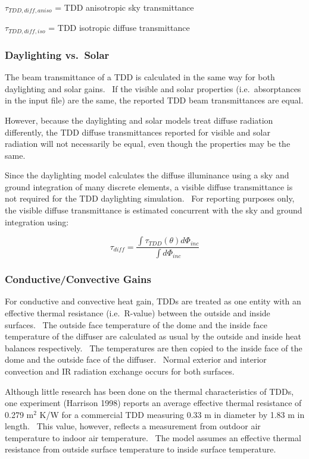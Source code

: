 \(\tau_{TDD,diff,aniso}\) = TDD anisotropic sky transmittance

\(\tau_{TDD,diff,iso}\) = TDD isotropic diffuse transmittance

\subsubsection{Daylighting vs.~Solar}\label{daylighting-vs.solar}

The beam transmittance of a TDD is calculated in the same way for both daylighting and solar gains.~ If the visible and solar properties (i.e.~absorptances in the input file) are the same, the reported TDD beam transmittances are equal.

However, because the daylighting and solar models treat diffuse radiation differently, the TDD diffuse transmittances reported for visible and solar radiation will not necessarily be equal, even though the properties may be the same.

Since the daylighting model calculates the diffuse illuminance using a sky and ground integration of many discrete elements, a visible diffuse transmittance is not required for the TDD daylighting simulation.~ For reporting purposes only, the visible diffuse transmittance is estimated concurrent with the sky and ground integration using:

\begin{equation}
{\tau_{diff}} = \frac{{\int {{\tau_{TDD}}(\theta )d{\Phi_{inc}}} }}{{\int {d{\Phi_{inc}}} }}
\end{equation}

\subsubsection{Conductive/Convective Gains}\label{conductiveconvective-gains}

For conductive and convective heat gain, TDDs are treated as one entity with an effective thermal resistance (i.e.~R-value) between the outside and inside surfaces.~ The outside face temperature of the dome and the inside face temperature of the diffuser are calculated as usual by the outside and inside heat balances respectively.~ The temperatures are then copied to the inside face of the dome and the outside face of the diffuser.~ Normal exterior and interior convection and IR radiation exchange occurs for both surfaces.

Although little research has been done on the thermal characteristics of TDDs, one experiment (Harrison 1998) reports an average effective thermal resistance of 0.279 m\(^{2}\) K/W for a commercial TDD measuring 0.33 m in diameter by 1.83 m in length.~ This value, however, reflects a measurement from outdoor air temperature to indoor air temperature.~ The model assumes an effective thermal resistance from outside surface temperature to inside surface temperature.

